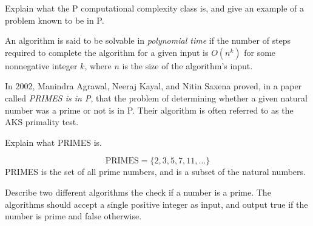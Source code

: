\documentclass[a4paper, 12pt]{exam}
\begin{document}
\begin{questions}
\begin{solution}
\end{solution}


\question
  Explain what the P computational complexity class is, and give an example of a problem known to be in P.
  \begin{solution}
    An algorithm is said to be solvable in \emph{polynomial time} if the number of steps required to complete the algorithm for a given input is $O(n^k)$ for some nonnegative integer $k$, where $n$ is the size of the algorithm's input.

    In 2002, Manindra Agrawal, Neeraj Kayal, and Nitin Saxena proved, in a paper called \emph{PRIMES is in P}, that the problem of determining whether a given natural number was a prime or not is in P.
    Their algorithm is often referred to as the AKS primality test.
  \end{solution}



\question
Explain what PRIMES is.
\begin{solution}
  \[ \textrm{PRIMES} = \{2, 3, 5, 7, 11, \ldots \} \]
  PRIMES is the set of all prime numbers, and is a subset of the natural numbers.
\end{solution}


\question
  Describe two different algorithms the check if a number is a prime.
  The algorithms should accept a single positive integer as input, and output true if the number is prime and false otherwise.


\end{questions}
\end{document}
